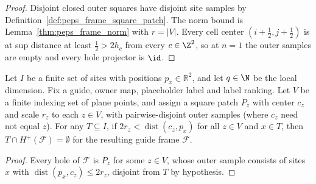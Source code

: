 \begin{proof}\leanok
    Disjoint closed outer squares have disjoint site samples by Definition~\ref{def:peps_frame_square_patch}. The norm bound is
    Lemma~\ref{thm:peps_frame_norm} with $r=\lvert V\rvert$.
    Every cell center $(i+\tfrac12,j+\tfrac12)$ is at sup distance at least $\tfrac12>2h_c$ from every $c\in\Z^2$, so at $n=1$ the outer samples are empty and every hole projector is
    $\id$.
\end{proof}

\begin{lemma}
    \label{lem:peps_guide_frame_outer_holes_disjoint}
    \leanok
    Let $I$ be a finite set of sites with positions $p_x\in\mathbb R^2$, and
    let $q\in\N$ be the local dimension. Fix a guide, owner map,
    placeholder label and label ranking. Let $V$ be a finite indexing
    set of plane points, and assign a square patch $P_z$ with center $c_z$ and scale $r_z$ to each $z\in V$,
    with pairwise-disjoint outer samples (where $c_z$ need not equal $z$).
    For any $T\subseteq I$, if
    $2r_z<\operatorname{dist}(c_z,p_x)$ for all $z\in V$ and $x\in T$,
    then $T\cap H^+(\mathcal F)=\emptyset$ for the resulting guide frame $\mathcal F$.
\end{lemma}

\begin{proof}\leanok
    Every hole of $\mathcal F$ is $P_z$ for some $z\in V$, whose outer
    sample consists of sites $x$ with $\operatorname{dist}(p_x,c_z)\le2r_z$, disjoint from $T$ by hypothesis.
\end{proof}

